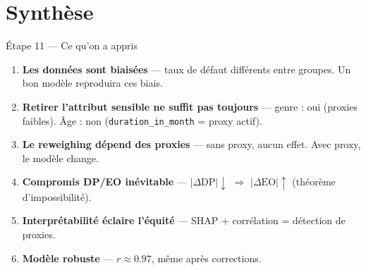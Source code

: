 \documentclass[aspectratio=169, 11pt]{beamer}
\begin{document}
\section{Synth\`ese}

\begin{frame}{\'Etape 11 --- Ce qu'on a appris}
\begin{enumerate}
    \item \textbf{Les donn\'ees sont biais\'ees} --- taux de d\'efaut diff\'erents entre groupes.
          Un bon mod\`ele reproduira ces biais.

    \item \textbf{Retirer l'attribut sensible ne suffit pas toujours} ---
          genre : oui (proxies faibles).
          \^Age : non (\texttt{duration\_in\_month} = proxy actif).

    \item \textbf{Le reweighing d\'epend des proxies} ---
          sans proxy, aucun effet. Avec proxy, le mod\`ele change.

    \item \textbf{Compromis DP/EO in\'evitable} ---
          $|\Delta\text{DP}| \downarrow$ $\Rightarrow$ $|\Delta\text{EO}| \uparrow$
          (th\'eor\`eme d'impossibilit\'e).

    \item \textbf{Interpr\'etabilit\'e \'eclaire l'\'equit\'e} ---
          SHAP + corr\'elation = d\'etection de proxies.

    \item \textbf{Mod\`ele robuste} --- $r \approx 0.97$, m\^eme apr\`es corrections.
\end{enumerate}
\end{frame}
\end{document}
